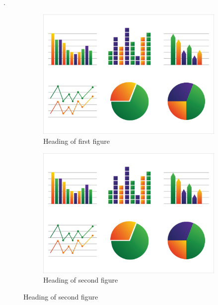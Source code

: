 \documentclass[12pt,green,palatino]{../bppaper}
\begin{document}
\blindtext \cite{latex2e}.
\begin{figure}[t]
\centering
\caption{Main heading of the figure, with \texttt{[t]}}
\begin{subfigure}{0.48\textwidth}
\caption{Heading of first figure}
\includegraphics[width=1\linewidth]{graph}
\end{subfigure}
\begin{subfigure}{0.48\textwidth}
\caption{Heading of second figure}
\includegraphics[width=1\linewidth]{graph}
\end{subfigure}
\end{figure}
\blindtext

\clearpage



\clearpage
\end{document}
